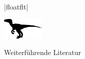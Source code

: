 \documentclass[
	vorläufig=true,
	datum=2017-11-24,
	titel={Grafiken, Abbildungen, TikZ},
	web=true,
	mo,
]{../tex/latexkurs-slides}
\begin{document}
\begin{frame}[fragile]{|floatflt|}
\begin{LTXexample}[preset=\fontsize{4}{5}\selectfont,pos=b]
\blindtext
\begin{floatingfigure}[r]{2cm}
  \includegraphics[width=2cm]{05_raptor}
\end{floatingfigure}
\blindtext[3]
\end{LTXexample}
\end{frame}



\nocite{minimaltikz, tikz, dante:pstricks, graphicscompanion}
\begin{frame}[allowframebreaks]{Weiterführende Literatur}
\printbibliography
\end{frame}
\end{document}
